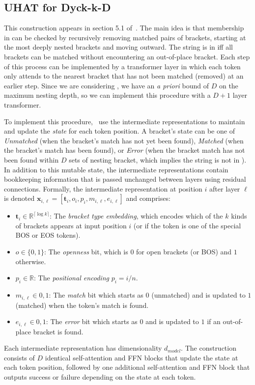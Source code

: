 \subsection{UHAT for Dyck-k-D}
This construction appears in section 5.1 of~\citet{yao-2021-self-attention}.
The main idea is that membership in  can be checked by recursively removing matched pairs of brackets, starting at the most deeply nested brackets and moving outward. The string is in  iff all brackets can be matched without encountering an out-of-place bracket. Each step of this process can be implemented by a transformer layer in which each token only attends to the nearest bracket that has not been matched (removed) at an earlier step. Since we are considering , we have an \textit{a priori} bound of $D$ on the maximum nesting depth, so we can implement this procedure with a $D+1$ layer transformer. 

To implement this procedure,~\citet{yao-2021-self-attention} use the intermediate representations to maintain and update the \textit{state} for each token position. A bracket's state can be one of \textit{Unmatched} (when the bracket's match has not yet been found), \textit{Matched} (when the bracket's match has been found), or \textit{Error} (when the bracket match has not been found within $D$ sets of nesting bracket, which implies the string is not in ). In addition to this mutable state, the intermediate representations contain bookkeeping information that is passed unchanged between layers using residual connections. Formally, the intermediate representation at position $i$ after layer $\ell$ is denoted $\mathbf{x}_{i,\ell} = [\mathbf{t}_i, o_i, p_i, m_{i,\ell}, e_{i,\ell}]$ and comprises:\begin{itemize}
    \item $\mathbf{t}_i \in \mathbb{R}^{\lceil\log k\rceil}$: The \textit{bracket type embedding}, which encodes which of the $k$ kinds of brackets appears at input position $i$ (or if the token is one of the special BOS or EOS tokens).
    \item $o \in \{0,1\}$: The \textit{openness} bit, which is $0$ for open brackets (or BOS) and $1$ otherwise.
    \item $p_i \in \mathbb{R}$: The \textit{positional encoding} $p_i = i/n$.
    \item $m_{i,\ell} \in {0,1}$: The \textit{match} bit which starts as $0$ (unmatched) and is updated to $1$ (matched) when the token's match is found.
    \item $e_{i,\ell} \in {0,1}$: The \textit{error} bit which starts as $0$ and is updated to $1$ if an out-of-place bracket is found.
\end{itemize}
Each intermediate representation has dimensionality $d_{model}$. The construction consists of $D$ identical self-attention and FFN blocks that update the state at each token position, followed by one additional self-attention and FFN block that outputs success or failure depending on the state at each token.

